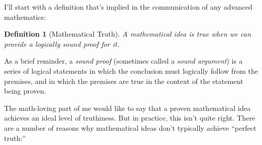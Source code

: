 \documentclass[11pt, oneside]{article}
\newtheorem*{defn}{Definition}
\theoremstyle{argtstyle}
\begin{document}
I'll start with a definition that's
implied in the communication of any advanced mathematics:

\begin{defn}[Mathematical Truth]
    A mathematical idea is true when we can provide a logically sound proof for
    it.
\end{defn}

As a brief reminder, a {\em sound proof} (sometimes called a
{\em sound argument}) is a series of logical statements in
which the conclusion must logically follow from the premises, and in which the
premises are true in the context of the statement being proven.

The math-loving part of me would like to say that a proven mathematical idea
achieves an ideal level of truthiness. But in practice, this isn't quite
right. There are a number of reasons why mathematical ideas don't typically
achieve ``perfect truth:''
\end{document}

